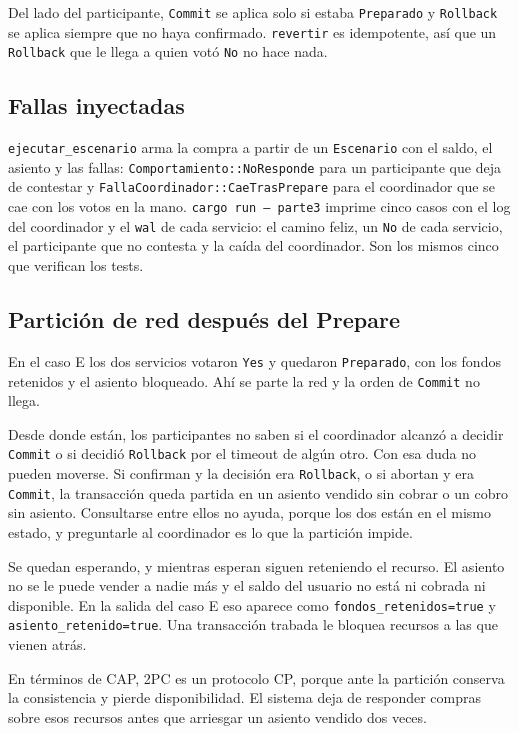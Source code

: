 Del lado del participante, \texttt{Commit} se aplica solo si estaba
\texttt{Preparado} y \texttt{Rollback} se aplica siempre que no haya
confirmado. \texttt{revertir} es idempotente, así que un \texttt{Rollback}
que le llega a quien votó \texttt{No} no hace nada.

\subsection{Fallas inyectadas}

\texttt{ejecutar\_escenario} arma la compra a partir de un
\texttt{Escenario} con el saldo, el asiento y las fallas:
\texttt{Comportamiento::NoResponde} para un participante que deja de
contestar y \texttt{FallaCoordinador::CaeTrasPrepare} para el coordinador
que se cae con los votos en la mano. \texttt{cargo run -- parte3} imprime
cinco casos con el log del coordinador y el \texttt{wal} de cada servicio:
el camino feliz, un \texttt{No} de cada servicio, el participante que no
contesta y la caída del coordinador. Son los mismos cinco que verifican los
tests.

\subsection{Partición de red después del Prepare}

En el caso E los dos servicios votaron \texttt{Yes} y quedaron
\texttt{Preparado}, con los fondos retenidos y el asiento bloqueado. Ahí se
parte la red y la orden de \texttt{Commit} no llega.

Desde donde están, los participantes no saben si el coordinador alcanzó a
decidir \texttt{Commit} o si decidió \texttt{Rollback} por el timeout de
algún otro. Con esa duda no pueden moverse. Si confirman y la decisión era
\texttt{Rollback}, o si abortan y era \texttt{Commit}, la transacción queda
partida en un asiento vendido sin cobrar o un cobro sin asiento.
Consultarse entre ellos no ayuda, porque los dos están en el mismo estado, y
preguntarle al coordinador es lo que la partición impide.

Se quedan esperando, y mientras esperan siguen reteniendo el recurso. El
asiento no se le puede vender a nadie más y el saldo del usuario no está ni
cobrada ni disponible. En la salida del caso E eso aparece como
\texttt{fondos\_retenidos=true} y \texttt{asiento\_retenido=true}. Una
transacción trabada le bloquea recursos a las que vienen atrás.

En términos de CAP, 2PC es un protocolo CP, porque ante la partición
conserva la consistencia y pierde disponibilidad. El sistema deja de responder compras sobre esos
recursos antes que arriesgar un asiento vendido dos veces.

